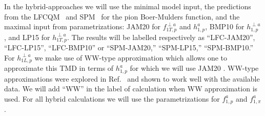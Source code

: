 \documentclass[a4paper]{article}
\begin{document}
In the hybrid-approaches we will use the minimal model input,
the predictions from the LFCQM~\cite{Pasquini:2014ppa} and SPM~\cite{Gamberg:2009uk}
for the pion Boer-Mulders
function, and the maximal input from parametrizations: 
JAM20 \cite{Cammarota:2020qcw} for $f_{1T,p}^{\perp a}$ and $h_{1,p}^a$,
BMP10 \cite{Barone:2009hw} for $h_{1,p}^{\perp a}$, and 
LP15 \cite{Lefky:2014eia} for $h_{1T,p}^{\perp a}$. 
The results will be labelled respectively
as ``LFC-JAM20'', ``LFC-LP15'', ``LFC-BMP10''  
or ``SPM-JAM20,'' ``SPM-LP15,'' ``SPM-BMP10.''
For $h_{1L,p}^{\perp a}$ we make use of WW-type approximation 
which allows one to approximate this TMD in terms of $h_{1,p}^a$ for
which we will use JAM20 \cite{Cammarota:2020qcw}. 
WW-type approximations  were explored in Ref.~\cite{Bastami:2018xqd} 
and shown to work well with the available data. We will add ``WW'' 
in the label of calculation when WW approximation is used.
For all hybrid calculations we will use the parametrizations
\cite{Martin:2009iq,Sutton:1991ay} for $f_{1,p}^a$ and $f_{1,\pi}^a$.
\end{document}
